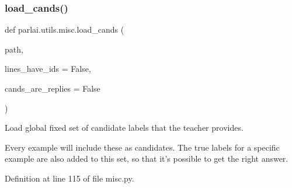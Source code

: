 \subsubsection{\texorpdfstring{load\+\_\+cands()}{load\_cands()}}
{\footnotesize\ttfamily def parlai.\+utils.\+misc.\+load\+\_\+cands (\begin{DoxyParamCaption}\item[{}]{path,  }\item[{}]{lines\+\_\+have\+\_\+ids = {\ttfamily False},  }\item[{}]{cands\+\_\+are\+\_\+replies = {\ttfamily False} }\end{DoxyParamCaption})}

\begin{DoxyVerb}Load global fixed set of candidate labels that the teacher provides.

Every example will include these as candidates. The true labels for a specific
example are also added to this set, so that it's possible to get the right answer.
\end{DoxyVerb}
 

Definition at line 115 of file misc.\+py.


